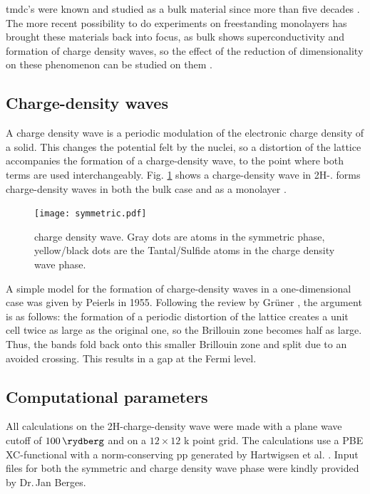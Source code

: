 \documentclass[main.tex]{subfiles}
\begin{document}
\acrshort{tmdc}'s were known and studied as a bulk material since more than five decades \cite{wilson_transition_1969}.
The more recent possibility to do experiments on freestanding monolayers \cite{novoselov_two-dimensional_2005} has brought these materials back into focus,  as bulk \TaS shows superconductivity and formation of charge density waves, so the effect of the reduction of dimensionality on these phenomenon can be studied on them \cite{navarro-moratalla_enhanced_2016}.

\subsection{Charge-density waves}

A charge density wave is a periodic modulation of the electronic charge density of a solid.
This changes the potential felt by the nuclei, so a distortion of the lattice accompanies the formation of a charge-density wave, to the point where both terms are used interchangeably.
Fig. \ref{fig:tas2_cdw_structure} shows a charge-density wave in 2H-\TaS.
\TaS forms charge-density waves in both the bulk case \cite{wilson_charge-density_1974} and as a monolayer \cite{hall_environmental_2019}.

\begin{figure}[ht!]
    \centering
    \texttt{[image: symmetric.pdf]}
    \caption{\TaS charge density wave. Gray dots are atoms in the symmetric phase, yellow/black dots are the Tantal/Sulfide atoms in the charge density wave phase.}
    \label{fig:tas2_cdw_structure}
\end{figure}

A simple model for the formation of charge-density waves in a one-dimensional case was given by Peierls in 1955.
Following the review by Grüner \cite{gruner_dynamics_1988}, the argument is as follows: 
the formation of a periodic distortion of the lattice creates a unit cell twice as large as the original one, so the Brillouin zone becomes half as large.
Thus, the bands fold back onto this smaller Brillouin zone and split due to an avoided crossing.
This results in a gap at the Fermi level.

\subsection{Computational parameters}

All calculations on the 2H-\TaS charge-density wave were made with a plane wave cutoff of \(\SI{100}{\rydberg}\) and on a \(12\times12\) k point grid.
The calculations use a PBE XC-functional with a norm-conserving \acrshort{pp} generated by Hartwigsen et al. \cite{hartwigsen_relativistic_1998}.
Input files for both the symmetric and charge density wave phase were kindly provided by Dr.\,Jan Berges.
\end{document}
